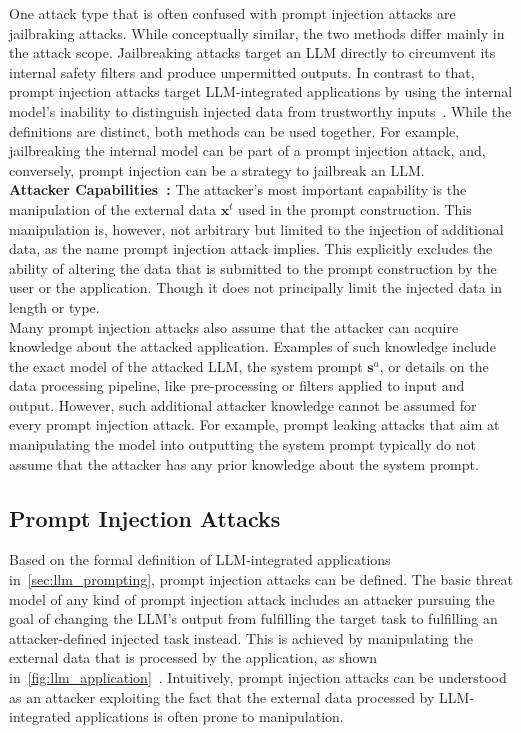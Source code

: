 One attack type that is often confused with prompt injection attacks are jailbraking attacks.
While conceptually similar, the two methods differ mainly in the attack scope.
Jailbreaking attacks target an LLM directly to circumvent its internal safety filters and produce unpermitted outputs.
In contrast to that, prompt injection attacks target LLM-integrated applications by using the internal model's inability to distinguish injected data from trustworthy inputs~\cite{willison_prompt_2024}.
While the definitions are distinct, both methods can be used together.
For example, jailbreaking the internal model can be part of a prompt injection attack, and, conversely, prompt injection can be a strategy to jailbreak an LLM.\\

\textbf{Attacker Capabilities~\cite{liu_formalizing_2024}:}
The attacker's most important capability is the manipulation of the external data $\textbf{x}^t$ used in the prompt construction.
This manipulation is, however, not arbitrary but limited to the injection of additional data, as the name prompt injection attack implies.
This explicitly excludes the ability of altering the data that is submitted to the prompt construction by the user or the application.
Though it does not principally limit the injected data in length or type.\\

Many prompt injection attacks also assume that the attacker can acquire knowledge about the attacked application.
Examples of such knowledge include the exact model of the attacked LLM, the system prompt $\textbf{s}^a$, or details on the data processing pipeline, like pre-processing or filters applied to input and output.
However, such additional attacker knowledge cannot be assumed for every prompt injection attack.
For example, prompt leaking attacks that aim at manipulating the model into outputting the system prompt typically do not assume that the attacker has any prior knowledge about the system prompt.

\subsection{Prompt Injection Attacks} \label{sec:prompt_inj_def}
Based on the formal definition of LLM-integrated applications in~\cref{sec:llm_prompting}, prompt injection attacks can be defined.
The basic threat model of any kind of prompt injection attack includes an attacker pursuing the goal of changing the LLM's output from fulfilling the target task to fulfilling an attacker-defined injected task instead.
This is achieved by manipulating the external data that is processed by the application, as shown in~\cref{fig:llm_application}~\cite{liu_formalizing_2024}.
Intuitively, prompt injection attacks can be understood as an attacker exploiting the fact that the external data processed by LLM-integrated applications is often prone to manipulation.\\

